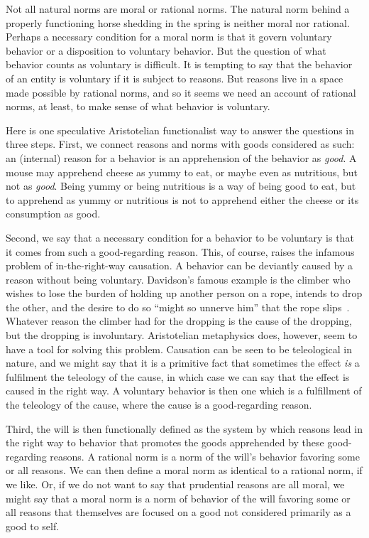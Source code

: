 Not all natural norms are moral or rational norms. The natural norm behind a properly functioning horse shedding in the spring
is neither moral nor rational. Perhaps a necessary condition for a moral norm is that it govern voluntary behavior or a disposition to voluntary behavior.
But the question of what behavior counts as voluntary is difficult. It is tempting to say that the behavior of an entity is
voluntary if it is subject to reasons. But reasons live in a space made possible by rational norms, and so it seems we need
an account of rational norms, at least, to make sense of what behavior is voluntary.

Here is one speculative Aristotelian functionalist way to answer the questions in three steps. First, we connect reasons and norms with goods
considered as such: an (internal) reason 
for a behavior is an apprehension of the behavior as \textit{good}. A mouse may apprehend cheese as yummy to eat, or maybe even as nutritious, 
but not as \textit{good}. Being yummy or being nutritious is a way of being good to eat, but to apprehend as yummy or nutritious is not to apprehend either the cheese or its consumption as good.

Second, we say that a necessary condition for a behavior to be voluntary is that it 
comes from such a good-regarding reason. This, of course, raises the infamous problem of in-the-right-way causation. A behavior can be deviantly caused by a reason
without being voluntary. Davidson's famous example is the climber who wishes to lose the burden of holding up another person on a rope, intends to drop the other, and the desire to do so ``might so unnerve him'' that the rope slips~\parencite[p.~79]{DavidsonEssays}. Whatever reason 
the climber had for the dropping is the cause of the dropping, but the dropping is involuntary. Aristotelian metaphysics does, however, seem
to have a tool for solving this problem. Causation can be seen to be teleological in nature, and we might say that it is 
a primitive fact that sometimes the effect \textit{is} a fulfilment the teleology of the cause, in which case we can say that the effect 
is caused in the right way. A voluntary behavior is then one which is a fulfillment of the teleology of the cause,
where the cause is a good-regarding reason.

Third, the will is then functionally defined as the system by which reasons lead in the right way to behavior that promotes 
the goods apprehended by these good-regarding reasons. A rational norm is a norm of the will's behavior
favoring some or all reasons. We can then define a moral norm as identical to a rational norm, if we like.
Or, if we do not want to say that prudential reasons are all moral, we might say that a moral norm is a 
norm of behavior of the will favoring some or all reasons that themselves are focused on  a good not considered 
primarily as a good to self. 

